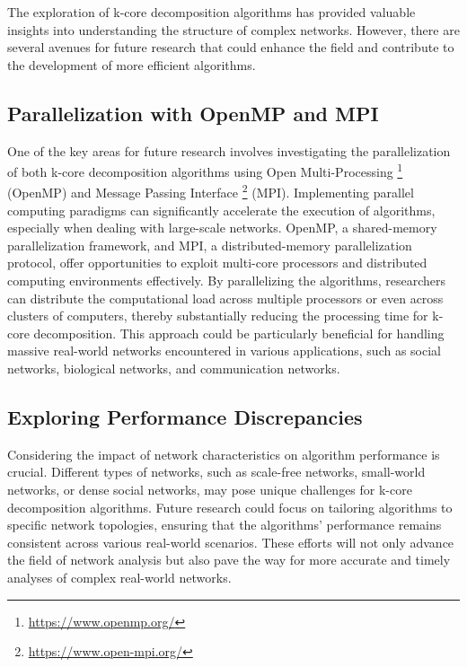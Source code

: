 The exploration of k-core decomposition algorithms has provided valuable insights into understanding the structure of complex networks. However, there are several avenues for future research that could enhance the field and contribute to the development of more efficient algorithms.

\subsection{Parallelization with OpenMP and MPI}

One of the key areas for future research involves investigating the parallelization of both k-core decomposition algorithms using Open Multi-Processing \footnote{\url{https://www.openmp.org/}} (OpenMP) and Message Passing Interface \footnote{\url{https://www.open-mpi.org/}} (MPI). Implementing parallel computing paradigms can significantly accelerate the execution of algorithms, especially when dealing with large-scale networks. OpenMP, a shared-memory parallelization framework, and MPI, a distributed-memory parallelization protocol, offer opportunities to exploit multi-core processors and distributed computing environments effectively. By parallelizing the algorithms, researchers can distribute the computational load across multiple processors or even across clusters of computers, thereby substantially reducing the processing time for k-core decomposition. This approach could be particularly beneficial for handling massive real-world networks encountered in various applications, such as social networks, biological networks, and communication networks.


\subsection{Exploring Performance Discrepancies}


Considering the impact of network characteristics on algorithm performance is crucial. Different types of networks, such as scale-free networks, small-world networks, or dense social networks, may pose unique challenges for k-core decomposition algorithms. Future research could focus on tailoring algorithms to specific network topologies, ensuring that the algorithms' performance remains consistent across various real-world scenarios. These efforts will not only advance the field of network analysis but also pave the way for more accurate and timely analyses of complex real-world networks.
